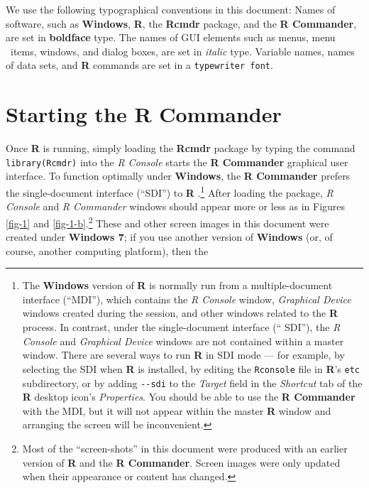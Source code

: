 \documentclass{article}%
\begin{document}
We use the following typographical conventions in this document: Names of
software, such as \textbf{Windows}, \textbf{R}, the \textbf{Rcmdr} package,
and the \textbf{R Commander}, are set in \textbf{boldface} type. The names of
GUI elements such as menus, menu \ items, windows, and dialog boxes, are set
in \emph{italic} type. Variable names, names of data sets, and \textbf{R}
commands are set in a \texttt{typewriter font}.

\section{Starting the R Commander}

Once \textbf{R} is running, simply loading the \textbf{Rcmdr} package by
typing the command \texttt{library(Rcmdr)} into the \emph{R Console} starts
the \textbf{R Commander} graphical user interface. To function optimally under
\textbf{Windows}, the \textbf{R Commander} prefers the single-document
interface (\textquotedblleft SDI\textquotedblright) to \textbf{R}%
.\footnote{The \textbf{Windows} version of \textbf{R} is normally run from a
multiple-document interface (\textquotedblleft MDI\textquotedblright), which
contains the \emph{R Console} window, \emph{Graphical Device} windows created
during the session, and other windows related to the \textbf{R} process. In
contrast, under the single-document interface (\textquotedblleft
SDI\textquotedblright), the \emph{R Console} and \emph{Graphical Device}
windows are not contained within a master window. There are several ways to
run \textbf{R} in SDI mode --- for example, by selecting the SDI when
\textbf{R} is installed, by editing the \texttt{Rconsole} file in \textbf{R}'s
\texttt{etc} subdirectory, or by adding \texttt{-{}-sdi} to the \emph{Target}
field in the \emph{Shortcut} tab of the \textbf{R} desktop icon's
\emph{Properties}. You should be able to use the \textbf{R Commander} with the
MDI, but it will not appear within the master \textbf{R} window and arranging
the screen will be inconvenient.} After loading the package, \emph{R Console}
and \emph{R Commander} windows should appear more or less as in Figures
\ref{fig-1} and \ref{fig-1-b}.\footnote{Most of the ``screen-shots'' in this document
were produced with an earlier version of \textbf{R} and the \textbf{R Commander}.
Screen images were only updated when their appearance or content has changed.}
These and other screen images in this document
were created under \textbf{Windows 7}; if you use another version of
\textbf{Windows} (or, of course, another computing platform), then the
\end{document}
